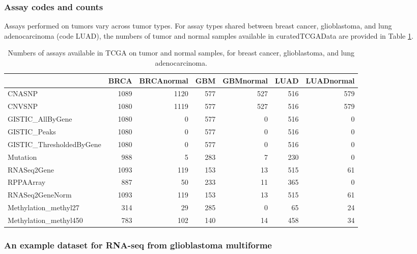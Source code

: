 \hypertarget{assay-codes-and-counts}{%
\subsubsection{Assay codes and counts}\label{assay-codes-and-counts}}

Assays performed on tumors vary across tumor types. For assay
types shared between
breast cancer, glioblastoma, and lung adenocarcinoma (code LUAD),
the numbers of tumor and normal samples available in curatedTCGAData
are provided in Table \ref{tab:tab-doassc}.

\begin{table}

\caption{\label{tab:tab-doassc}Numbers of assays available in TCGA on tumor and normal samples,
for breast cancer, glioblastoma, and lung adenocarcinoma.}
\centering
\begin{tabular}[t]{lrrrrrr}
\toprule
  & BRCA & BRCAnormal & GBM & GBMnormal & LUAD & LUADnormal\\
\midrule
CNASNP & 1089 & 1120 & 577 & 527 & 516 & 579\\
CNVSNP & 1080 & 1119 & 577 & 527 & 516 & 579\\
GISTIC\_AllByGene & 1080 & 0 & 577 & 0 & 516 & 0\\
GISTIC\_Peaks & 1080 & 0 & 577 & 0 & 516 & 0\\
GISTIC\_ThresholdedByGene & 1080 & 0 & 577 & 0 & 516 & 0\\
\addlinespace
Mutation & 988 & 5 & 283 & 7 & 230 & 0\\
RNASeq2Gene & 1093 & 119 & 153 & 13 & 515 & 61\\
RPPAArray & 887 & 50 & 233 & 11 & 365 & 0\\
RNASeq2GeneNorm & 1093 & 119 & 153 & 13 & 515 & 61\\
Methylation\_methyl27 & 314 & 29 & 285 & 0 & 65 & 24\\
\addlinespace
Methylation\_methyl450 & 783 & 102 & 140 & 14 & 458 & 34\\
\bottomrule
\end{tabular}
\end{table}

\hypertarget{an-example-dataset-for-rna-seq-from-glioblastoma-multiforme}{%
\subsubsection{An example dataset for RNA-seq from glioblastoma multiforme}\label{an-example-dataset-for-rna-seq-from-glioblastoma-multiforme}}

